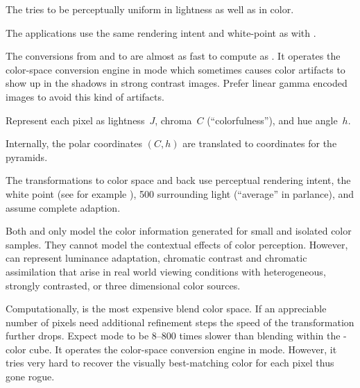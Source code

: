 \begin{description}
  The  tries to be perceptually uniform in lightness as well as in color.

  The applications use the same rendering intent and white-point as with .

  The conversions from and to  are almost as fast to compute as
  .  It operates the  color-space conversion engine in
   mode which sometimes causes color artifacts to
  show up in the shadows in strong contrast images.  Prefer linear gamma encoded images to avoid
  this kind of artifacts.

\item[\urlmark{\wikipediaciecam}{\acronym{CIECAM02}}]\itemend\urltext
  Represent each pixel as lightness~$J$, chroma~$C$ (``colorfulness''), and hue
  angle~$h$.

  \begin{geeknote}
    Internally, the polar coordinates $(C, h)$ are translated to 
    coordinates for the pyramids.
  \end{geeknote}

  The transformations to  color space and back use perceptual rendering
  intent, the  white point (see for example
  ), 500 surrounding light
  (``average'' in  parlance), and assume complete adaption.

  Both  and  only model the color information generated for
  small and isolated color samples.  They cannot model the contextual effects of color
  perception.  However,  can represent luminance adaptation, chromatic
  contrast and chromatic assimilation that arise in real world viewing conditions with
  heterogeneous, strongly contrasted, or three dimensional color sources.

  Computationally,  is the most expensive blend color space.  If an
  appreciable number of pixels need additional refinement steps the speed of the transformation
  further drops.  Expect  mode to be 8--800 times slower than blending within
  the -color cube.  It operates the  color-space conversion
  engine in  mode.  However, it tries very hard to
  recover the visually best-matching color for each pixel thus gone rogue.
\end{description}

